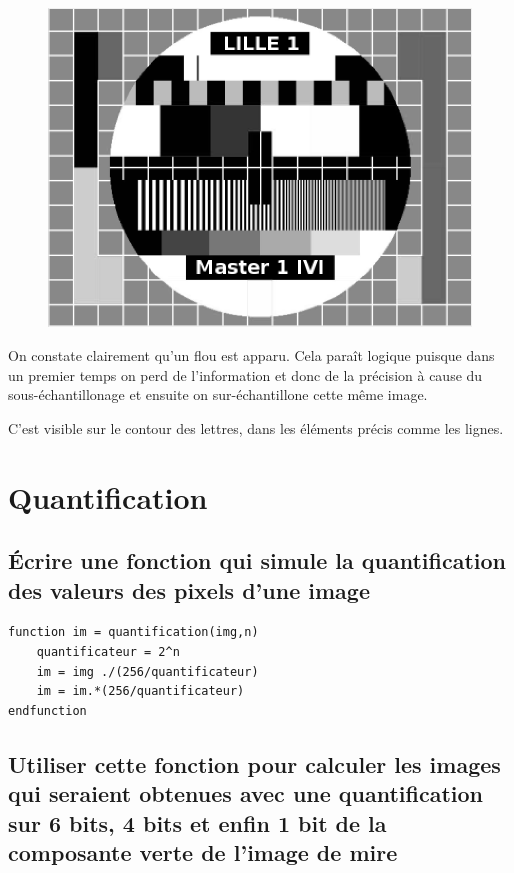 \documentclass[a4paper,12pt]{report}
\begin{document}
\begin{figure}[!ht]
	\center
	\includegraphics[scale=0.6]{image/p24.png}
\end{figure}

\noindent On constate clairement qu'un flou est apparu. Cela paraît logique puisque dans un premier temps on perd de l'information et donc de la précision à cause du sous-échantillonage et ensuite on sur-échantillone cette même image. 

C'est visible sur le contour des lettres, dans les éléments précis comme les lignes.


\newpage
\section*{Quantification}

\subsection*{Écrire une fonction qui simule la quantification des valeurs des pixels d'une image}

\begin{lstlisting}
function im = quantification(img,n)
    quantificateur = 2^n
    im = img ./(256/quantificateur)
    im = im.*(256/quantificateur)
endfunction
\end{lstlisting}

\subsection*{Utiliser cette fonction pour calculer les images qui seraient obtenues avec une quantification sur 6 bits, 4 bits et enfin 1 bit de la composante verte de l'image de mire}
\end{document}
